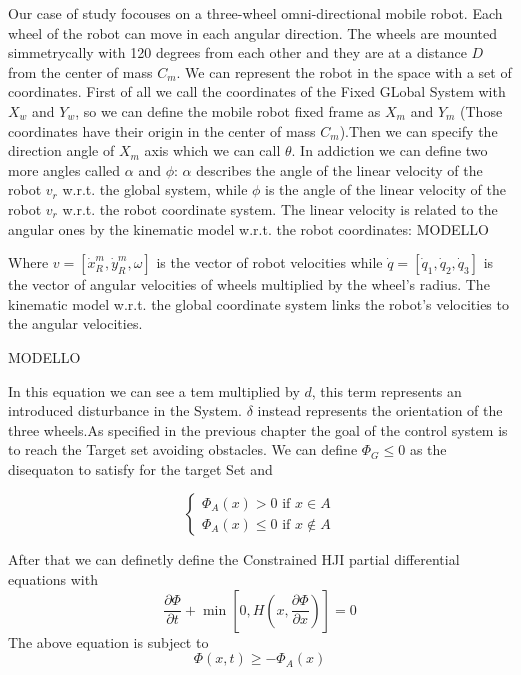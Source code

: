 Our case of study focouses on a three-wheel omni-directional mobile robot. Each wheel of the robot can move in each angular direction. The wheels are mounted simmetrycally with 120 degrees from each other and they are at a distance $D$  from the center of mass $C_{m}$. We can represent the robot in the space with a set of coordinates. First of all we call the coordinates of the Fixed GLobal System with $X_{w}$ and $Y_{w}$, so we can define the mobile robot fixed frame as $X_{m}$ and $Y_{m}$ (Those coordinates have their origin in the center of mass $C_{m}$).Then we can specify the direction angle of $X_{m}$ axis which we can call $\theta$. In addiction we can define two more angles called $\alpha$ and $\phi$: $\alpha$ describes the angle of the linear velocity of the robot $v_{r}$ w.r.t. the global system, while $\phi$ is the angle of the linear velocity of the robot $v_{r}$ w.r.t. the robot coordinate system. The linear velocity is related to the angular ones by the kinematic model w.r.t. the robot coordinates:
MODELLO

Where $v = [\dot{x}^{m}_{R},\dot{y}^{m}_{R},\omega]$ is the vector of robot velocities while $\dot{q} = [\dot{q}_{1},\dot{q}_{2},\dot{q}_{3}]$ is the vector of angular velocities of wheels multiplied by the wheel's radius.
The kinematic model w.r.t. the global coordinate system links the robot's velocities to the angular velocities.

MODELLO

In this equation we can see a tem multiplied by $d$, this term represents an introduced disturbance in the System. $\delta$ instead represents the orientation of the three wheels.As specified in the previous chapter the goal of the control system is to reach the Target set avoiding obstacles. We can define $\Phi_{G}\leq0$ as the disequaton to satisfy for the target Set and 

\begin{equation}
	\label{ode}
	\left\{
		\begin{array}{ll}
			\Phi_{A}(x)>0 \text{ if } x \in A \\
			\Phi_{A}(x)\leq 0 \text{ if } x \notin A
		\end{array}
	\right.
\end{equation}

After that we can definetly define the Constrained HJI partial differential equations with 
\begin{equation}
    \frac{\partial{\Phi}}{\partial{t}} + \min \left[ 0,H \left( x,\frac{\partial{\Phi}}{\partial{x}} \right) \right] = 0
\end{equation}
The above equation is subject to 
\begin{equation}
    \Phi(x,t)\geq - \Phi_{A}(x)
\end{equation}

